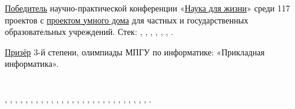 \documentclass[margin,line]{resume}
\begin{document}
\begin{resume}
  \href{https://alchemmist.github.io/CV/attachments/scince-for-life-win.pdf}{Победитель}
  научно-практической конференции
  «\href{https://conf.profil.mos.ru/academ}{Наука для
  жизни}» среди 117 проектов с
  \href{https://github.com/smart-cab/}{проектом умного
  дома} для частных и государственных
  образовательных учреждений. Стек: ,
  , , ,
  , , .

  \href{https://alchemmist.github.io/CV/attachments/informatics-olimpic.pdf}{Призёр}
  3-й степени, олимпиады МПГУ по информатике:
  «Прикладная информатика».

  \section{}
  , , ,
  , ,
  , , ,
  ,
  , ,
  , ,
  , ,
  , ,
  , ,
  , , ,
  , , ,
  , ,
  , .

\end{resume}

\clearpage
\end{document}
